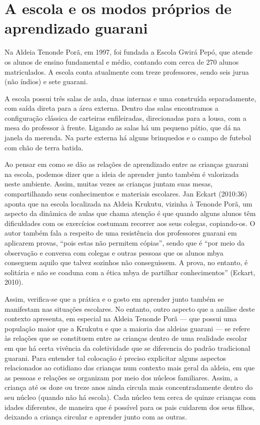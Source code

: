 \section{A escola e os modos próprios de aprendizado guarani}

Na Aldeia Tenonde Porã, em 1997, foi fundada a Escola Gwirá Pepó, que
atende os alunos de ensino fundamental e médio, contando com cerca de
270 alunos matriculados. A escola conta atualmente com treze
professores, sendo seis jurua (não índios) e sete guarani.

A escola possui três salas de aula, duas internas e uma construída
separadamente, com saída direta para a área externa. Dentro das salas
encontramos a configuração clássica de carteiras enfileiradas,
direcionadas para a lousa, com a mesa do professor à frente. Ligando as
salas há um pequeno pátio, que dá na janela da merenda. Na parte
externa há alguns brinquedos e o campo de futebol com chão de terra
batida. 

Ao pensar em como se dão as relações de aprendizado entre as crianças
guarani na escola, podemos dizer que a ideia de aprender junto também é
valorizada neste ambiente. Assim, muitas vezes as crianças juntam suas
mesas, compartilhando seus conhecimentos e materiais escolares. Jan
Eckart (2010:36) aponta que na escola localizada na Aldeia Krukutu,
vizinha à Tenonde Porã, um aspecto da dinâmica de aulas que chama
atenção é que quando alguns alunos têm dificuldades com os exercícios
costumam recorrer aos seus colegas, copiando-os. O autor também fala a
respeito de uma resistência dos professores guarani em aplicarem
provas, ``pois estas não permitem cópias'', sendo que é ``por meio da
observação e conversa com colegas e outras pessoas que os alunos mbya
conseguem aquilo que talvez sozinhos não conseguissem. A prova, no
entanto, é solitária e não se coaduna com a ética mbya de partilhar
conhecimentos'' (Eckart, 2010).

Assim, verifica-se que a prática e o gosto em aprender junto também se
manifestam nas situações escolares. No entanto, outro aspecto que a
análise deste contexto apresenta, em especial na Aldeia Tenonde Porã ---
que possui uma população maior que a Krukutu e que a maioria das
aldeias guarani --- se refere às relações que se constituem entre as
crianças dentro de uma realidade escolar em que há certa vivência da
coletividade que se diferencia do padrão tradicional guarani. Para
entender tal colocação é preciso explicitar alguns aspectos
relacionados ao cotidiano das crianças num contexto mais geral da
aldeia, em que as pessoas e relações se organizam por meio dos núcleos
familiares. Assim, a criança até os doze ou treze anos ainda circula
mais concentradamente dentro do seu núcleo (quando não há escola). Cada
núcleo tem cerca de quinze crianças com idades diferentes, de maneira
que é possível para os pais cuidarem dos seus filhos, deixando a criança
circular e aprender junto com as outras.

